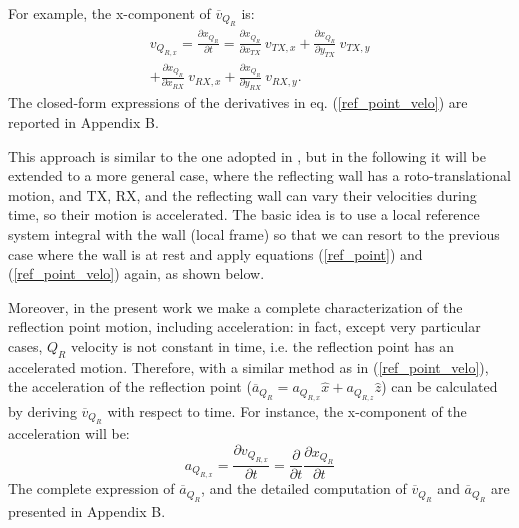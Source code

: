 For example, the x-component of $\overline{v}_{Q_{R}}$ is:
\begin{equation}
\begin{gathered}
v_{Q_{R,x}} = \frac{\partial x_{Q_R}}{\partial t} = \frac{\partial x_{Q_R}}{\partial x_{TX}}~v_{TX,x} + \frac{\partial x_{Q_R}}{\partial y_{TX}}~v_{TX,y}  \\ + \frac{\partial x_{Q_R}}{\partial x_{RX}}~v_{RX,x} + \frac{\partial x_{Q_R}}{\partial y_{RX}}~v_{RX,y}.
\end{gathered}
\label{ref_point_velo}
\end{equation}
The closed-form expressions of the derivatives in eq. (\ref{ref_point_velo}) are reported in Appendix B.


This approach is similar to the one adopted in \cite{qua}, but in the following it will be extended to a more general case, where the reflecting wall has a roto-translational motion, and TX, RX, and the reflecting wall can vary their velocities during time, so their motion is accelerated.
The basic idea is to use a local reference system integral with the wall (local frame) so that we can resort to the previous case where the wall is at rest and apply equations (\ref{ref_point}) and (\ref{ref_point_velo}) again, as shown below. \par

Moreover, in the present work we make a complete characterization of the reflection point motion, including acceleration: in fact, except very particular cases, $Q_R$ velocity is not constant in time, i.e. the reflection point has an accelerated motion. Therefore, with a similar method as in (\ref{ref_point_velo}), the acceleration of the reflection point ($\overline{a}_{Q_{R}}=a_{Q_{R,x}}\hat{x}+a_{Q_{R,z}}\hat{z}$) can be calculated by deriving $\overline{v}_{Q_{R}}$ with respect to time. For instance, the x-component of the acceleration will be:  
\begin{equation}
a_{Q_{R,x}} = \frac{\partial v_{Q_{R,x}}}{\partial t} = \frac{\partial}{\partial t} \frac{\partial x_{Q_{R}}}{\partial t} 
\label{ref_point_acc}
\end{equation}
The complete expression of $\overline{a}_{Q_{R}}$, and the detailed computation of $\overline{v}_{Q_{R}}$ and $\overline{a}_{Q_{R}}$ are presented in Appendix B. \par 

